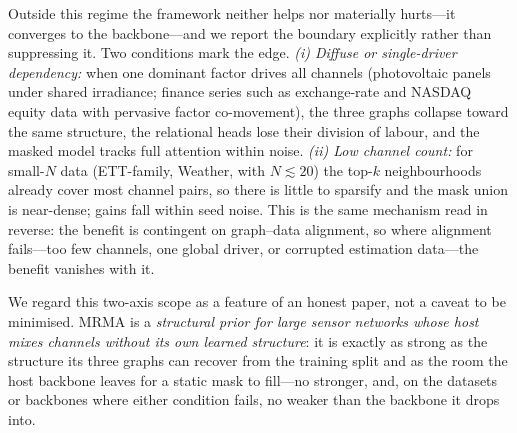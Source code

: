 Outside this regime the framework neither helps nor materially hurts---it
converges to the backbone---and we report the boundary explicitly rather than
suppressing it.
Two conditions mark the edge.
\emph{(i) Diffuse or single-driver dependency:} when one dominant factor drives
all channels (photovoltaic panels under shared irradiance; finance series such
as exchange-rate and NASDAQ equity data with pervasive factor co-movement), the
three graphs collapse toward the same structure, the relational heads lose their
division of labour, and the masked model tracks full attention within noise.
\emph{(ii) Low channel count:} for small-$N$ data (ETT-family, Weather, with
$N{\lesssim}20$) the top-$k$ neighbourhoods already cover most channel pairs, so
there is little to sparsify and the mask union is near-dense; gains fall within
seed noise.
This is the same mechanism read in reverse: the benefit is contingent on
graph--data alignment, so where alignment fails---too few channels, one global
driver, or corrupted estimation data---the benefit vanishes with it.

We regard this two-axis scope as a feature of an honest paper, not a caveat to be
minimised.
MRMA is a \emph{structural prior for large sensor networks whose host mixes
channels without its own learned structure}: it is exactly as strong as the
structure its three graphs can recover from the training split and as the room
the host backbone leaves for a static mask to fill---no stronger, and, on the
datasets or backbones where either condition fails, no weaker than the backbone
it drops into.
